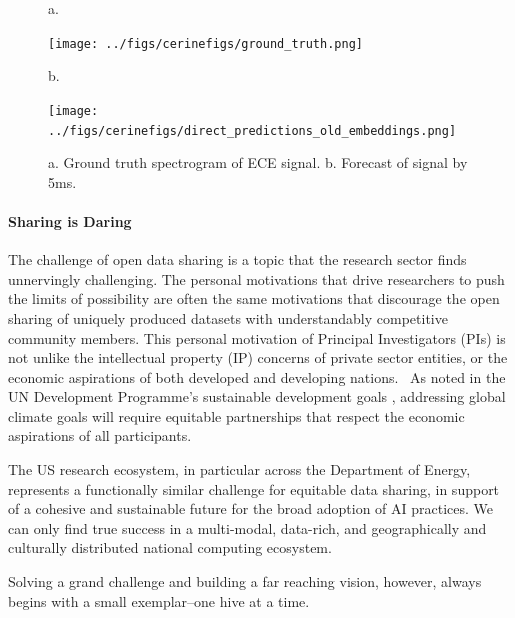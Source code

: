 \begin{figure}
	\raggedright{a.}\\
	\centerline{\texttt{[image: ../figs/cerinefigs/ground\_truth.png]}}
	\raggedright{b.}\\
	\centerline{\texttt{[image: ../figs/cerinefigs/direct\_predictions\_old\_embeddings.png]}}
	\caption{\label{fig::spectrograms}
		a. Ground truth spectrogram of ECE signal. b. Forecast of signal by 5ms.}
\end{figure}

\paragraph{Sharing is Daring}
The challenge of open data sharing is a topic that the research sector finds unnervingly challenging. 
The personal motivations that drive researchers to push the limits of possibility are often the same motivations that discourage the open sharing of uniquely produced datasets with understandably competitive community members. 
This personal motivation of Principal Investigators (PIs) is not unlike the intellectual property (IP) concerns of private sector entities, or the economic aspirations of both developed and developing nations.  
As noted in the UN Development Programme's sustainable development goals \cite{SDGs}, addressing global climate goals will require equitable partnerships that respect the economic aspirations of all participants.

The US research ecosystem, in particular across the Department of Energy, represents a functionally similar challenge for equitable data sharing, in support of a cohesive and sustainable future for the broad adoption of AI practices. 
We can only find true success in a multi-modal, data-rich, and geographically and culturally distributed national computing ecosystem. 

Solving a grand challenge and building a far reaching vision, however, always begins with a small exemplar--one hive at a time.



